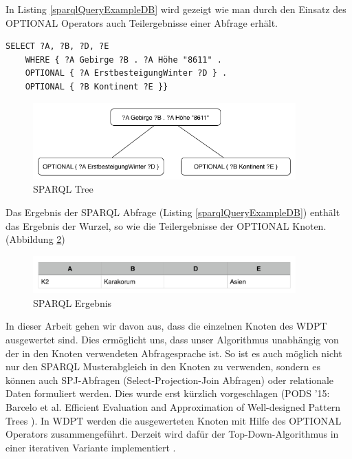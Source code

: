 \documentclass[draft,final]{vutinfth} %
\begin{document}
In Listing \ref{sparqlQueryExampleDB} wird gezeigt wie man durch den Einsatz des OPTIONAL Operators auch Teilergebnisse einer Abfrage erhält.

\begin{lstlisting}[float,language=Sparql,caption={SPARQL DB Beispiel},frame = single,label={sparqlQueryExampleDB}]
SELECT ?A, ?B, ?D, ?E
	WHERE { ?A Gebirge ?B . ?A Höhe "8611" . 
	OPTIONAL { ?A ErstbesteigungWinter ?D } .
	OPTIONAL { ?B Kontinent ?E }}
\end{lstlisting}

\begin{figure}[ht]
	\centering
	\includegraphics[width=0.9\textwidth]{SPARQL}
	\caption{SPARQL Tree}
	\label{sparqlTree}
\end{figure}

Das Ergebnis der SPARQL Abfrage (Listing \ref{sparqlQueryExampleDB}) enthält das Ergebnis der Wurzel, so wie die Teilergebnisse der OPTIONAL Knoten. (Abbildung \ref{sparqlErgebnis})

\begin{figure}[ht]
	\centering
	\includegraphics[width=0.9\textwidth]{sparqlErgebnis}
	\caption{SPARQL Ergebnis}
	\label{sparqlErgebnis}
\end{figure}

In dieser Arbeit gehen wir davon aus, dass die einzelnen Knoten des WDPT ausgewertet sind. Dies ermöglicht uns, dass unser Algorithmus unabhängig von der in den Knoten verwendeten Abfragesprache ist. So ist es auch möglich nicht nur den SPARQL Musterabgleich in den Knoten zu verwenden, sondern es können auch SPJ-Abfragen (Select-Projection-Join Abfragen) oder relationale Daten formuliert werden. Dies wurde erst kürzlich vorgeschlagen (PODS '15: Barcelo et al. Efficient Evaluation and Approximation of Well-designed Pattern Trees \cite{DBLP:conf/pods/BarceloPS15}). In WDPT werden die ausgewerteten Knoten mit Hilfe des OPTIONAL Operators zusammengeführt. Derzeit wird dafür der Top-Down-Algorithmus \cite{LPPS2013} in einer iterativen Variante implementiert \cite{OptMat}.
\end{document}
